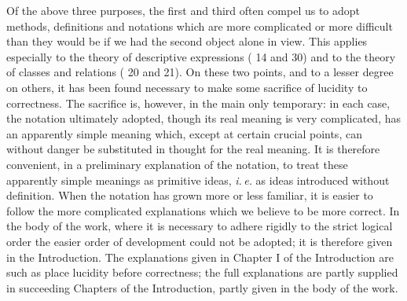 \documentclass{scrartcl}
\DeclareRobustCommand*{\pmstar}{%
  \text{%
      \resizebox{!}{.75\height}{\ding{107}}%
        }%
}
\begin{document}
Of the above three purposes, the first and third often compel us to adopt methods, definitions and notations which are more complicated or more difficult than they would be if we had the second
object alone in view. This applies especially to the theory of descriptive expressions (\pmstar 14 and \pmstar 30) and to the theory of classes and relations (\pmstar 20 and \pmstar 21). On these two points, and to a lesser degree on others, it has been found necessary to make some sacrifice of lucidity to correctness. The sacrifice is, however, in the main only temporary: in each case, the notation ultimately adopted, though its real meaning is very complicated, has an apparently simple meaning which, except at certain crucial points, can without danger be substituted in thought for the real meaning. It is therefore convenient, in a preliminary explanation of the notation, to treat these apparently simple meanings as primitive ideas, \textit{i.\,e.} as ideas introduced without definition. When the notation has grown more or less familiar, it is easier to follow the more complicated explanations which we believe to be more correct. In the body of the work, where it is necessary to adhere rigidly to the strict logical order the easier order of development could not be adopted; it is therefore given in the Introduction. The explanations given in Chapter I of the Introduction are such as place lucidity before correctness; the full explanations are partly supplied in succeeding Chapters of the Introduction, partly given in the body of the work.
\end{document}
